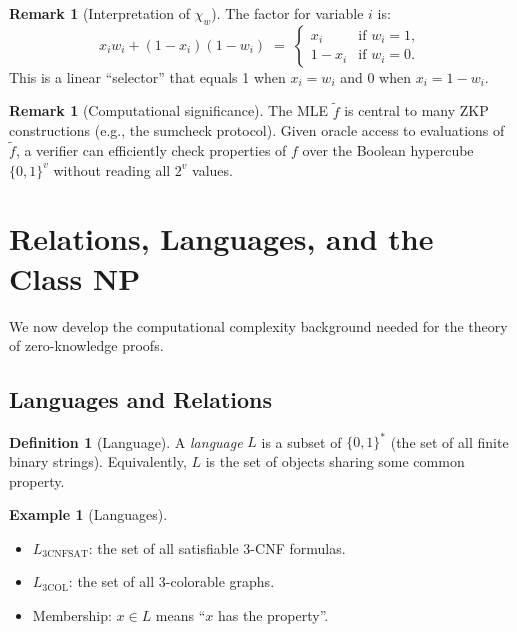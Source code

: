 \documentclass[11pt]{article}
\theoremstyle{plain}
\theoremstyle{definition}
\newtheorem{definition}[theorem]{Definition}
\newtheorem{example}[theorem]{Example}
\newtheorem{remark}[theorem]{Remark}
\begin{document}
\begin{remark}[Interpretation of $\chi_w$]
The factor for variable $i$ is:
\[
  x_i w_i + (1-x_i)(1-w_i)
  \;=\;
  \begin{cases}
    x_i & \text{if } w_i = 1, \\
    1 - x_i & \text{if } w_i = 0.
  \end{cases}
\]
This is a linear ``selector'' that equals 1 when $x_i = w_i$ and 0 when $x_i = 1 - w_i$.
\end{remark}

\begin{remark}[Computational significance]
The MLE $\widetilde{f}$ is central to many ZKP constructions (e.g., the sumcheck protocol).
Given oracle access to evaluations of $\widetilde{f}$, a verifier can efficiently check
properties of $f$ over the Boolean hypercube $\{0,1\}^v$ without reading all $2^v$ values.
\end{remark}

\section{Relations, Languages, and the Class NP}

We now develop the computational complexity background needed for the theory of
zero-knowledge proofs.

\subsection{Languages and Relations}

\begin{tcolorbox}[colback=blue!5!white, colframe=blue!50!black, title=Languages]
\begin{definition}[Language]
A \emph{language} $L$ is a subset of $\{0,1\}^*$ (the set of all finite binary strings).
Equivalently, $L$ is the set of objects sharing some common property.
\end{definition}
\end{tcolorbox}

\begin{example}[Languages]
\hfill
\begin{itemize}
  \item $L_{\mathrm{3CNFSAT}}$: the set of all satisfiable 3-CNF formulas.
  \item $L_{\mathrm{3COL}}$: the set of all 3-colorable graphs.
  \item Membership: $x \in L$ means ``$x$ has the property''.
\end{itemize}
\end{example}
\end{document}
